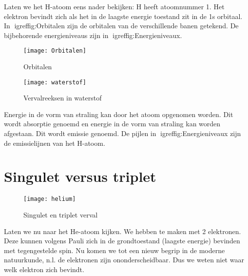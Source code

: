 Laten we het H-atoom eens nader bekijken: H heeft atoomnummer 1. Het
elektron bevindt zich als het in de laagste energie toestand zit in
de 1s orbitaal. In igref{fig:Orbitalen} zijn de orbitalen van
de verschillende banen getekend. De bijbehorende energieniveaus zijn
in igref{fig:Energieniveaux}.

\begin{figure}[h]
\noindent \begin{centering}
\texttt{[image: Orbitalen]}
\par\end{centering}

\caption{\label{fig:Orbitalen}Orbitalen}
\end{figure}


\begin{figure}[h]
\noindent \begin{centering}
\texttt{[image: waterstof]}
\par\end{centering}

\caption{\label{fig:Energieniveaux}Vervalreeksen in waterstof}
\end{figure}


Energie in de vorm van straling kan door het atoom opgenomen worden.
Dit wordt absorptie genoemd en energie in de vorm van straling kan
worden afgestaan. Dit wordt emissie genoemd. De pijlen in igref{fig:Energieniveaux}
zijn de emissielijnen van het H-atoom. 


\section{Singulet versus triplet}

\begin{figure}[h]
\noindent \begin{centering}
\texttt{[image: helium]}
\par\end{centering}

\caption{\label{fig:Singulet-en-triplet}Singulet en triplet verval}
\end{figure}


Laten we nu naar het He-atoom kijken. We hebben te maken met 2 elektronen.
Deze kunnen volgens Pauli zich in de grondtoestand (laagste energie)
bevinden met tegengestelde spin. Nu komen we tot een nieuw begrip
in de moderne natuurkunde, n.l. de elektronen zijn ononderscheidbaar.
Dus we weten niet waar welk elektron zich bevindt.

